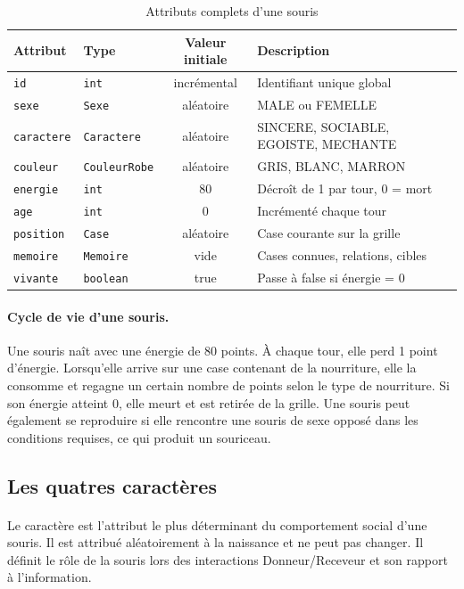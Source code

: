 \begin{table}[h!]
\centering
\renewcommand{\arraystretch}{1.4}
\begin{tabular}{|l|l|c|p{5.5cm}|}
\hline
\textbf{Attribut} & \textbf{Type} & \textbf{Valeur initiale} & \textbf{Description} \\
\hline
\texttt{id} & \texttt{int} & incrémental & Identifiant unique global \\
\texttt{sexe} & \texttt{Sexe} & aléatoire & MALE ou FEMELLE \\
\texttt{caractere} & \texttt{Caractere} & aléatoire & SINCERE, SOCIABLE, EGOISTE, MECHANTE \\
\texttt{couleur} & \texttt{CouleurRobe} & aléatoire & GRIS, BLANC, MARRON \\
\texttt{energie} & \texttt{int} & 80 & Décroît de 1 par tour, 0 = mort \\
\texttt{age} & \texttt{int} & 0 & Incrémenté chaque tour \\
\texttt{position} & \texttt{Case} & aléatoire & Case courante sur la grille \\
\texttt{memoire} & \texttt{Memoire} & vide & Cases connues, relations, cibles \\
\texttt{vivante} & \texttt{boolean} & true & Passe à false si énergie = 0 \\
\hline
\end{tabular}
\caption{Attributs complets d'une souris}
\label{tab:souris_attrs}
\end{table}

\paragraph{Cycle de vie d'une souris.} Une souris naît avec une énergie de 80 points. À chaque tour, elle perd 1 point d'énergie. Lorsqu'elle arrive sur une case contenant de la nourriture, elle la consomme et regagne un certain nombre de points selon le type de nourriture. Si son énergie atteint 0, elle meurt et est retirée de la grille. Une souris peut également se reproduire si elle rencontre une souris de sexe opposé dans les conditions requises, ce qui produit un souriceau.

\bigskip

\subsection{Les quatres caractères}

\paragraph{} Le caractère est l'attribut le plus déterminant du comportement social d'une souris. Il est attribué aléatoirement à la naissance et ne peut pas changer. Il définit le rôle de la souris lors des interactions Donneur/Receveur et son rapport à l'information.


